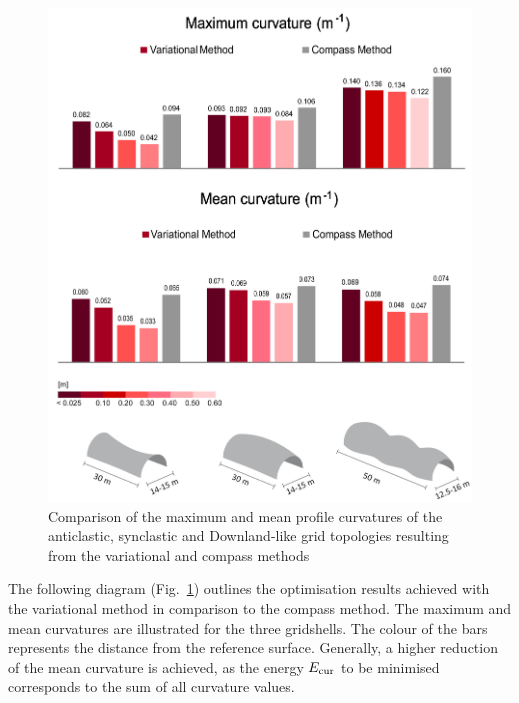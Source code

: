 \begin{figure}[t]
\centering
\includegraphics[width=0.80\linewidth]{images/CaseStudies_Regular/Balken.png}
\caption{Comparison of the maximum and mean profile curvatures of the anticlastic, synclastic and Downland-like grid topologies resulting from the variational and compass methods}
\label{fig:Balken}
\end{figure}

The following diagram  (Fig.~\ref{fig:Balken}) outlines the optimisation results achieved with the variational method in comparison to the compass method. The maximum and mean curvatures are illustrated for the three gridshells. The colour of the bars represents the distance from the reference surface. Generally, a higher reduction of the mean curvature is achieved, as the energy $E_{\textrm{\scriptsize{cur}}}$ to be minimised corresponds to the sum of all curvature values.





